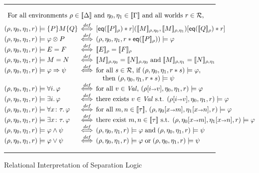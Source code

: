 \documentclass{LMCS}
\newcommand{\cR}{\mathcal{R}}
\newcommand{\sval}{\mathit{Val}}
\newcommand{\bind}{{\scriptstyle\relax\rightarrow}}
\newcommand{\ff}[1]{[\![#1]\!]}
\newcommand{\mtri}[3]{\{{#1}\}{#2}\{{#3}\}}
\newcommand{\squad}[4]{{[{#1}]}
                        ({#2},  {#3})
                       {[{#4}]}}
\newcommand{\EQ}{\mathsf{eq}}
\newcommand{\defliff}{\stackrel{\mathit{def}}{\iff}}
\begin{document}
\begin{figure*}[t]
\hrule
$$
\begin{array}{@{}l@{\,}c@{\,}l@{}}
\multicolumn{3}{l}{
\mbox{For all environments $\rho\in \ff{\Delta}$ 
      and $\eta_0,\eta_1 \in \ff{\Gamma}$ and all worlds $r \in \cR$,}
}
\\[1ex]
(\rho,\eta_0,\eta_1,r)
\models \mtri{P}{M}{Q}
& \defliff &
\squad{\EQ(\ff{P}_\rho)*r}{\ff{M}_{\rho,\eta_0}}{\ff{M}_{\rho,\eta_1}}{\EQ(\ff{Q}_\rho)*r}
\\
(\rho,\eta_0,\eta_1,r) 
\models \varphi \otimes P
& \defliff &
(\rho,\eta_0,\eta_1,r * \EQ(\ff{P}_\rho)) 
\models \varphi 
\\
(\rho,\eta_0,\eta_1,r) 
\models E = F
& \defliff &
\ff{E}_\rho = \ff{F}_\rho
\\
(\rho,\eta_0,\eta_1,r) 
\models M = N 
& \defliff &
\ff{M}_{\rho,\eta_0} = \ff{N}_{\rho,\eta_0}
\;\mbox{and}\;
\ff{M}_{\rho,\eta_1} = \ff{N}_{\rho,\eta_1}
\\
(\rho,\eta_0,\eta_1,r)
\models \varphi \Rightarrow \psi
& \defliff &
\begin{array}[t]{@{}l@{}}
\mbox{for all $s \in \cR$,
if $(\rho,\eta_0,\eta_1,r*s) \models \varphi$}, 
\\
\quad \mbox{then $(\rho,\eta_0,\eta_1,r*s) \models \psi$}
\end{array}
\\
(\rho,\eta_0,\eta_1,r)
\models \forall i.\,\varphi 
& \defliff &
\mbox{for all $v \in \sval$, }
(\rho[i\bind v],\eta_0,\eta_1,r)
\models \varphi 
\\
(\rho,\eta_0,\eta_1,r)
\models \exists i.\,\varphi 
& \defliff &
\mbox{there exists $v \in \sval$ s.t. }
(\rho[i\bind v],\eta_0,\eta_1,r)
\models \varphi 
\\
(\rho,\eta_0,\eta_1,r)
\models \forall x\colon\tau.\,\varphi 
& \defliff &
\mbox{for all $m,n \in \ff{\tau}$, }
(\rho,\eta_0[x\bind m],\eta_1[x\bind n],r)
\models \varphi 
\\
(\rho,\eta_0,\eta_1,r)
\models \exists x\colon\tau.\,\varphi 
& \defliff &
\mbox{there exist $m,n \in \ff{\tau}$ s.t. }
(\rho,\eta_0[x\bind m],\eta_1[x \bind n],r)
\models \varphi 
\\
(\rho,\eta_0,\eta_1,r)
\models \varphi \wedge \psi
& \defliff &
(\rho,\eta_0,\eta_1,r)
\models \varphi 
\;\mbox{and}\;
(\rho,\eta_0,\eta_1,r)
\models \psi
\\
(\rho,\eta_0,\eta_1,r)
\models \varphi \vee \psi
& \defliff &
(\rho,\eta_0,\eta_1,r)
\models \varphi 
\;\mbox{or}\;
(\rho,\eta_0,\eta_1,r)
\models \psi
\end{array}
$$
\hrule
\caption{Relational Interpretation of Separation Logic}
\label{fig:definition-satisfaction}
\end{figure*}
\end{document}
